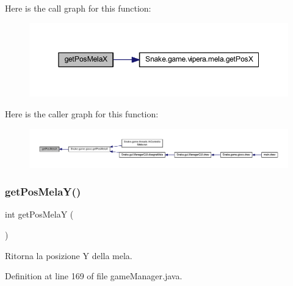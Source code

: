 Here is the call graph for this function\+:
\nopagebreak
\begin{figure}[H]
\begin{center}
\leavevmode
\includegraphics[width=350pt]{class_snake_1_1game_1_1utility_1_1game_manager_aae6590f1c2572c796a9ea154e3b16b27_cgraph}
\end{center}
\end{figure}
Here is the caller graph for this function\+:
\nopagebreak
\begin{figure}[H]
\begin{center}
\leavevmode
\includegraphics[width=350pt]{class_snake_1_1game_1_1utility_1_1game_manager_aae6590f1c2572c796a9ea154e3b16b27_icgraph}
\end{center}
\end{figure}
\mbox{\label{class_snake_1_1game_1_1utility_1_1game_manager_ac23b89dc8711992dc3124c04888a1365}} 
\subsubsection{\texorpdfstring{get\+Pos\+Mela\+Y()}{getPosMelaY()}}
{\footnotesize\ttfamily int get\+Pos\+MelaY (\begin{DoxyParamCaption}{ }\end{DoxyParamCaption})}



Ritorna la posizione Y della mela. 



Definition at line 169 of file game\+Manager.\+java.

